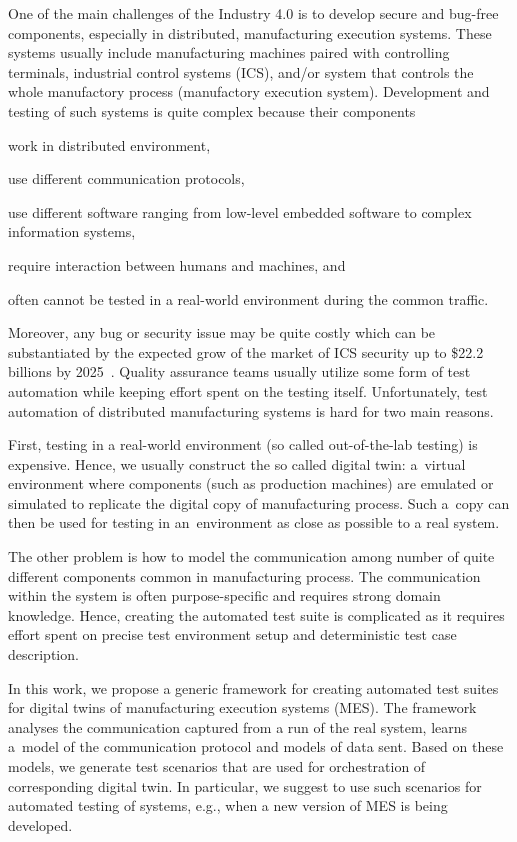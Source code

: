 {One of the main challenges of the Industry 4.0 is to develop secure and
bug-free components, especially in distributed, manufacturing execution
systems. These systems usually include manufacturing machines paired with
controlling terminals, industrial control systems (ICS), and/or system that
controls the whole manufactory process (manufactory execution system).
Development and testing of such systems is quite complex because their
components
%
\begin{inparaenum}[(1)]
%
 \item work in distributed environment,
%
 \item use different communication protocols, 
%
 \item use different software ranging from low-level embedded software to
 complex information systems, 
%
 \item require interaction between humans and machines, and
%
 \item often cannot be tested in a real-world environment during the common
 traffic.
%
\end{inparaenum}

Moreover, any bug or security issue may be quite costly which can be
substantiated by the expected grow of the market of ICS security up to \$22.2
billions by 2025~\cite{ref_market}.
%
Quality assurance teams usually utilize some form of test automation 
while keeping effort spent on the testing itself.  Unfortunately, test
automation of distributed manufacturing systems is hard for two main reasons.


First, testing in a real-world environment (so called out-of-the-lab testing)
is expensive.  Hence, we usually construct the so called digital twin:
a~virtual environment where components (such as production machines) are
emulated or simulated to replicate the digital copy of manufacturing process.  
%
Such a~copy can then be used for testing in an~environment as close as possible
to a real system.

The other problem is how to model the communication among number of quite
different components common in manufacturing process.
%
The communication within the system is often purpose-specific and requires
strong domain knowledge. 
%
Hence, creating the automated test suite is complicated as it requires effort
spent on precise test environment setup and deterministic test case
description.

In this work, we propose a generic framework for creating automated test suites
for digital twins of manufacturing execution systems (MES).  
%
The framework analyses the communication captured from a run of the real
system, learns a~model of the communication protocol and models of data sent.
%
Based on these models, we generate test scenarios that are used for
orchestration of corresponding digital twin.
%
In particular, we suggest to use such scenarios for automated testing of
systems, e.g., when a new version of MES is being developed.

}
